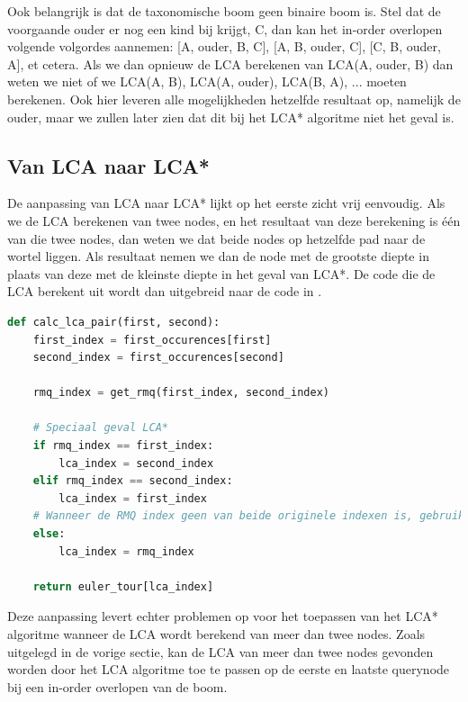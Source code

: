 Ook belangrijk is dat de taxonomische boom geen binaire boom is. Stel dat de
voorgaande ouder er nog een kind bij krijgt, C, dan kan het in-order overlopen
volgende volgordes aannemen: [A, ouder, B, C], [A, B, ouder, C], [C, B, ouder,
A], et cetera. Als we dan opnieuw de LCA berekenen van LCA(A, ouder, B) dan
weten we niet of we LCA(A, B), LCA(A, ouder), LCA(B, A), ... moeten berekenen.
Ook hier leveren alle mogelijkheden hetzelfde resultaat op, namelijk de ouder, 
maar
we zullen later zien dat dit bij het LCA* algoritme niet het geval is.

\subsection{Van LCA naar LCA*} 

De aanpassing van LCA naar LCA* lijkt op het eerste zicht vrij eenvoudig. Als we
de LCA berekenen van twee nodes, en het resultaat van deze berekening is één van
die twee nodes, dan weten we dat beide nodes op hetzelfde pad naar de wortel
liggen. Als resultaat nemen we dan de node met de grootste diepte in plaats van
deze met de kleinste diepte in het geval van LCA*. De code die de LCA berekent
uit  wordt dan uitgebreid naar de code in
.

\begin{lstlisting}[language=Python, caption={Uitbreinding van de voorbeeldcode 
uit \Vref{lst:lcaexample} in Python voor de LCA* berekening van 2 nodes}, 
label={lst:lca*example}, float]
def calc_lca_pair(first, second):
    first_index = first_occurences[first]
    second_index = first_occurences[second]
    
    rmq_index = get_rmq(first_index, second_index)
    
    # Speciaal geval LCA*
    if rmq_index == first_index:
        lca_index = second_index
    elif rmq_index == second_index:
        lca_index = first_index
    # Wanneer de RMQ index geen van beide originele indexen is, gebruik LCA
    else:
        lca_index = rmq_index
    
    return euler_tour[lca_index]
\end{lstlisting}

Deze aanpassing levert echter problemen op voor het toepassen van het LCA*
algoritme wanneer de LCA wordt berekend van meer dan twee nodes. Zoals uitgelegd
in de vorige sectie, kan de LCA van meer dan twee nodes gevonden worden door het
LCA algoritme toe te passen op de eerste en laatste querynode bij een in-order
overlopen van de boom.

